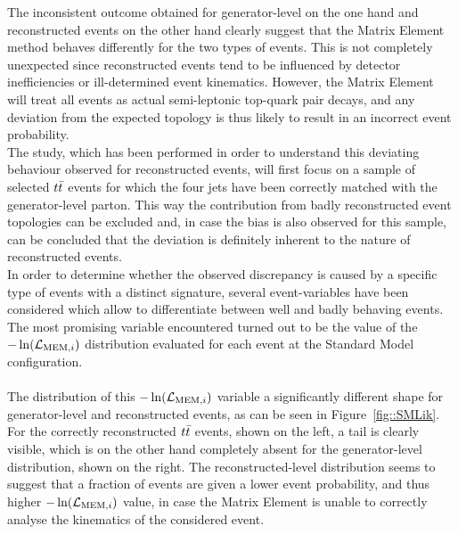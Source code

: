 The inconsistent outcome obtained for generator-level on the one hand and reconstructed events on the other hand clearly suggest that the Matrix Element method behaves differently for the two types of events.
This is not completely unexpected since reconstructed events tend to be influenced by detector inefficiencies or ill-determined event kinematics.
However, the Matrix Element will treat all events as actual semi-leptonic top-quark pair decays, and any deviation from the expected topology is thus likely to result in an incorrect event probability.
\\

The study, which has been performed in order to understand this deviating behaviour observed for reconstructed events, will first focus on a sample of selected $t\bar{t}$ events for which the four jets have been correctly matched with the generator-level parton.
This way the contribution from badly reconstructed event topologies can be excluded and, in case the bias is also observed for this sample, can be concluded that the deviation is definitely inherent to the nature of reconstructed events.
\\
In order to determine whether the observed discrepancy is caused by a specific type of events with a distinct signature, several event-variables have been considered which allow to differentiate between well and badly behaving events.
The most promising variable encountered turned out to be the value of the $-\ln(\mathcal{L}_{\textrm{MEM}, i})$ distribution evaluated for each event at the Standard Model configuration.
\\
\\
The distribution of this $-\ln(\mathcal{L}_{\textrm{MEM}, i})$ variable a significantly different shape for generator-level and reconstructed events, as can be seen in Figure~\ref{fig::SMLik}.
For the correctly reconstructed $t\bar{t}$ events, shown on the left, a tail is clearly visible, which is on the other hand completely absent for the generator-level distribution, shown on the right.
The reconstructed-level distribution seems to suggest that a fraction of events are given a lower event probability, and thus higher $-\ln(\mathcal{L}_{\textrm{MEM}, i})$ value, in case the Matrix Element is unable to correctly analyse the kinematics of the considered event.
